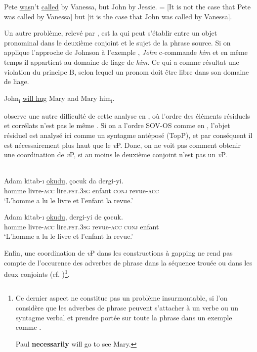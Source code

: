 \ea \label{ch2:ex195}
\ea Pete \uline{was}n’t \uline{called} by Vanessa, but John by Jessie.      
\ex = [It is not the case that Pete was called by Vanessa] but [it is the case that John was called by Vanessa]. 
\z
\z

Un autre problème, relevé par \citet{Ince2009}, est la  qui peut s’établir entre un objet pronominal dans le deuxième conjoint et le sujet de la phrase source. Si on applique l’approche de Johnson à l’exemple , \textit{John} c-commande \textit{him} et en même temps il appartient au domaine de liage de \textit{him}. Ce qui a comme résultat une violation du principe B, selon lequel un pronom doit être libre dans son domaine de liage.

\ea \label{ch2:ex196}
John\textsubscript{i} \uline{will hug} Mary and Mary him\textsubscript{i}. \citep[205]{Ince2009} 
\z

\citet{Ince2009} observe une autre difficulté de cette analyse en , où l’ordre des éléments résiduels et corrélats n’est pas le même . Si on a l’ordre SOV-OS comme en , l’objet résiduel est analysé ici comme un syntagme antéposé (TopP), et par conséquent il est nécessairement plus haut que le \textit{v}P. Donc, on ne voit pas comment obtenir une coordination de \textit{v}P, si au moins le deuxième conjoint n’est pas un \textit{v}P.

\ea \label{ch2:ex197}
\\
\ea 
\gll Adam  kitab-ı  \uline{okudu},  çocuk da dergi-yi. \label{ch2:ex197a}\\
homme  livre-\textsc{acc}  lire.\textsc{pst.3sg}  enfant \textsc{conj} revue-\textsc{acc}\\
\glt ‘L’homme a lu le livre et l’enfant la revue.’

\ex 
\gll Adam  kitab-ı  \uline{okudu},  dergi-yi de çocuk. \label{ch2:ex197b}\\
homme  livre-\textsc{acc}  lire.\textsc{pst.3sg}  revue-\textsc{acc} \textsc{conj} enfant\\
\glt ‘L’homme a lu le livre et l’enfant la revue.’ 
\z
\z

\newpage 
Enfin, une coordination de \textit{v}P dans les constructions à gapping ne rend pas compte de l’occurence des adverbes de phrase  dans la séquence trouée ou dans les deux conjoints (cf. \citealt{Gardent1991,Ince2009})\footnote{
 Ce dernier aspect ne constitue pas un problème insurmontable, si l’on considère que les adverbes de phrase peuvent s’attacher à un verbe ou un syntagme verbal et prendre portée sur toute la phrase dans un exemple comme .
 
\ea \label{ch2:foot59i}
Paul \textbf{necessarily} will go to see Mary.
\z
}. 



